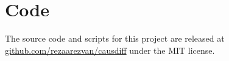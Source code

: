\section{Code}
\label{app:Code}
The source code and scripts for this project are released at \href{https://github.com/rezaarezvan/causdiff}{github.com/rezaarezvan/causdiff} under the MIT license.
